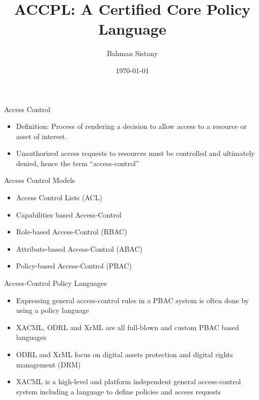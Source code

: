 \documentclass{beamer}
\title{ACCPL: A Certified Core Policy Language}
\author{Bahman Sistany}
\date{\today}
\begin{document}
\begin{frame}
\titlepage
\end{frame}


\begin{frame}{Access Control}
\begin{itemize}
   \item Definition: Process of rendering a decision to allow access to a resource or asset of interest.
   \item Unauthorized access requests to resources must be controlled and ultimately denied, hence the term ``access-control''
\end{itemize}
\end{frame}

\begin{frame}{Access Control Models}
\LARGE
\begin{itemize}
   \item Access Control Lists (ACL)
   \item Capabilities based Access-Control 
   \item Role-based Access-Control (RBAC)
   \item Attribute-based Access-Control (ABAC)
   \item Policy-based Access-Control (PBAC)
\end{itemize}
\end{frame}

\begin{frame}{Access-Control Policy Languages}
\begin{itemize}
   \item Expressing general access-control rules in a PBAC system is often done by using a policy language
   \item XACML, ODRL and XrML are all full-blown and custom PBAC based languages 
   \item ODRL and XrML focus on digital assets protection and digital rights management (DRM)
   \item XACML is a high-level and platform independent general access-control system including a language to define policies and access requests
\end{itemize}
\end{frame}
\end{document}
